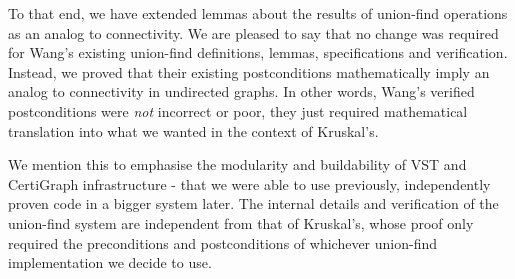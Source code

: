 To that end, we have extended lemmas about the results of union-find operations as an analog to connectivity. We are pleased to say that no change was required for Wang's existing union-find definitions, lemmas, specifications and verification. Instead, we proved that their existing postconditions mathematically imply an analog to connectivity in undirected graphs. In other words, Wang's verified postconditions were \textit{not} incorrect or poor, they just required mathematical translation into what we wanted in the context of Kruskal's.

We mention this to emphasise the modularity and buildability of VST and CertiGraph infrastructure - that we were able to use previously, independently proven code in a bigger system later. The internal details and verification of the union-find system are independent from that of Kruskal's, whose proof only required the preconditions and postconditions of whichever union-find implementation we decide to use.